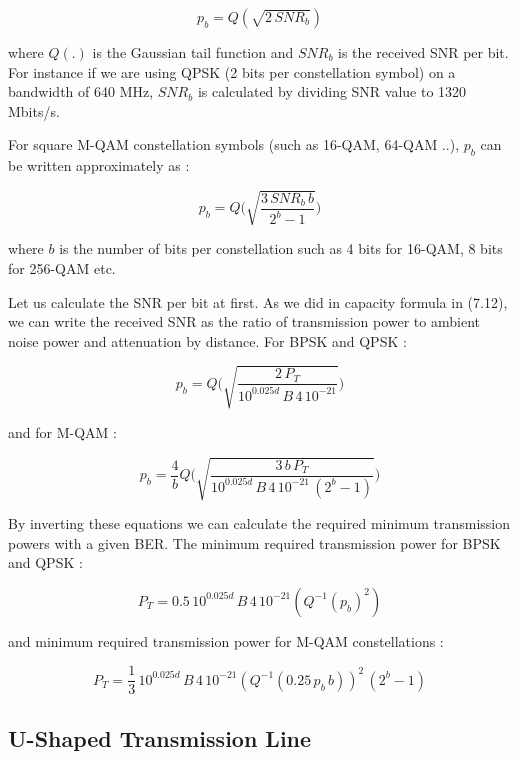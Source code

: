 \begin{equation}
p_{b} = Q(\sqrt{2\,SNR_{b}})
\end{equation}

where $Q(.)$ is the Gaussian tail function and $SNR_{b}$ is the received SNR per bit. For instance if we are using QPSK (2 bits per constellation symbol) on a bandwidth of 640 MHz, $SNR_{b}$ is calculated by dividing SNR value to 1320 Mbits/s.

For square M-QAM constellation symbols (such as 16-QAM, 64-QAM ..), $p_{b}$ can be written approximately as \cite{goldsmith2005wireless}: 

\begin{equation}
p_{b} = Q\bigg(\sqrt{\frac{3\,SNR_{b}\,b}{2^{b}-1}}\bigg)
\end{equation}

where $b$ is the number of bits per constellation such as 4 bits for 16-QAM, 8 bits for 256-QAM etc. 

Let us calculate the SNR per bit at first. As we did in capacity formula in (7.12), we can write the received SNR as the ratio of transmission power to ambient noise power and attenuation by distance. For BPSK and QPSK : 

\begin{equation}
p_{b} = Q\bigg(\sqrt{\frac{2\,P_{T}}{10^{0.025d}\,B\,4\,10^{-21}}}\bigg)
\end{equation}

and for M-QAM :

\begin{equation}
p_{b} = \frac{4}{b}Q\bigg(\sqrt{\frac{3\,b\,P_{T}}{10^{0.025d}\,B\,4\,10^{-21}\,(2^{b}-1)}}\bigg)
\end{equation}

By inverting these equations we can calculate the required minimum transmission powers with a given BER. The minimum required transmission power for BPSK and QPSK :

\begin{equation}
P_{T} = 0.5\,10^{0.025d}\,B\,4\,10^{-21}(Q^{-1}(p_{b})^{2})
\end{equation}

and minimum required transmission power for M-QAM constellations :

\begin{equation}
P_{T} = \frac{1}{3}\,10^{0.025d}\,B\,4\,10^{-21}(Q^{-1}(0.25\,p_{b}\,b))^{2}\,(2^{b}-1)
\end{equation}


\subsection{U-Shaped Transmission Line}

